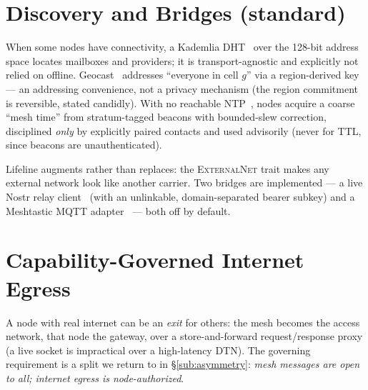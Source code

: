 \documentclass[11pt]{article}
\begin{document}
\section{Discovery and Bridges (standard)}\label{sec:discovery}

When some nodes have connectivity, a Kademlia DHT~\cite{maymounkov2002kademlia}
over the 128-bit address space locates mailboxes and providers; it is
transport-agnostic and explicitly not relied on offline.
Geocast~\cite{niemeyer2008geohash} addresses ``everyone in cell $g$'' via a
region-derived key --- an addressing convenience, not a privacy mechanism (the
region commitment is reversible, stated candidly). With no reachable
NTP~\cite{rfc5905}, nodes acquire a coarse ``mesh time'' from stratum-tagged
beacons with bounded-slew correction, disciplined \emph{only} by explicitly
paired contacts and used advisorily (never for TTL, since beacons are
unauthenticated).

\label{sec:bridge}Lifeline augments rather than replaces: the
\textsc{ExternalNet} trait makes any external network look like another carrier.
Two bridges are implemented --- a live Nostr relay client~\cite{nostrnip01} (with
an unlinkable, domain-separated bearer subkey) and a Meshtastic MQTT
adapter~\cite{meshtastic} --- both off by default.

\section{Capability-Governed Internet Egress}\label{sec:egress}

A node with real internet can be an \emph{exit} for others: the mesh becomes the
access network, that node the gateway, over a store-and-forward request/response
proxy (a live socket is impractical over a high-latency DTN). The governing
requirement is a split we return to in \S\ref{sub:asymmetry}: \emph{mesh messages
are open to all; internet egress is node-authorized}.
\end{document}
